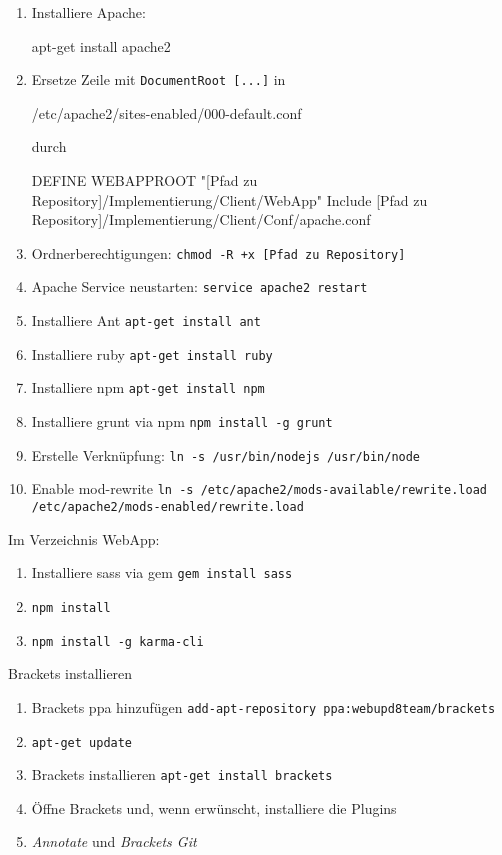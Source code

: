 \begin{enumerate}
	\item Installiere Apache: 	
	\begin{json}
		apt-get install apache2 
	\end{json}
	\item Ersetze Zeile mit \texttt{DocumentRoot [...]} in 
		\begin{json}
			/etc/apache2/sites-enabled/000-default.conf
		\end{json}
	durch
	
	\begin{json}
	DEFINE WEBAPPROOT "[Pfad zu Repository]/Implementierung/Client/WebApp"
	Include [Pfad zu Repository]/Implementierung/Client/Conf/apache.conf 
	\end{json}

	\setcounter{enumi}{2}
	\item Ordnerberechtigungen: \texttt{chmod -R +x [Pfad zu Repository] }
	\item Apache Service neustarten: \texttt{service apache2 restart}
	\item Installiere Ant \texttt{apt-get install ant}
	\item Installiere ruby \texttt{apt-get install ruby}
	\item Installiere npm \texttt{apt-get install npm}
	\item Installiere grunt via npm \texttt{npm install -g grunt}
	\item Erstelle Verknüpfung: \texttt{ln -s /usr/bin/nodejs /usr/bin/node}
	\item Enable mod-rewrite \texttt{ln -s /etc/apache2/mods-available/rewrite.load /etc/apache2/mods-enabled/rewrite.load}
\end{enumerate}
Im Verzeichnis WebApp:
\begin{enumerate}
	\item Installiere sass via gem \texttt{gem install sass}
	\item \texttt{npm install}
	\item \texttt{npm install -g karma-cli}
\end{enumerate}
Brackets installieren
\begin{enumerate}
	\item Brackets ppa hinzufügen \texttt{add-apt-repository ppa:webupd8team/brackets}
	\item \texttt{apt-get update}
	\item Brackets installieren \texttt{apt-get install brackets}
	\item Öffne Brackets und, wenn erwünscht, installiere die Plugins 
	\item \textit{Annotate} und \textit{Brackets Git}		
\end{enumerate}
